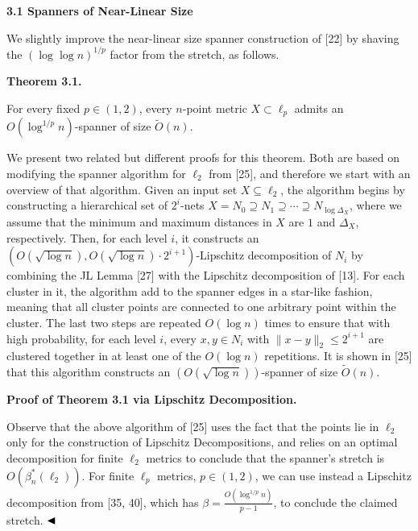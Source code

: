 \par
\par
\par\medskip\noindent\textbf{3.1 Spanners of Near-Linear Size}\par
We slightly improve the near-linear size spanner construction of [22] by shaving the $(\log\log{n})^{1/p}$ factor from the stretch, as follows.
\par
\par
\par\medskip\noindent\textbf{Theorem 3.1.}\par
For every fixed $p\in(1,2)$, every $n$-point metric $X\subset\ell_{p}$ admits an $O(\log^{1/p}{n})$-spanner of size $\tilde{O}(n)$.
\par
\par
\par
We present two related but different proofs for this theorem. Both are based on modifying the spanner algorithm for $\ell_{2}$ from [25], and therefore we start with an overview of that algorithm. Given an input set $X\subseteq\ell_{2}$, the algorithm begins by constructing a hierarchical set of $2^{i}$-nets $X=N_{0}\supseteq N_{1}\supseteq\cdots\supseteq N_{\log{\Delta_{X}}}$, where we assume that the minimum and maximum distances in $X$ are $1$ and $\Delta_{X}$, respectively. Then, for each level $i$, it constructs an $(O(\sqrt{\log n}),O(\sqrt{\log n})\cdot 2^{i+1})$-Lipschitz decomposition of $N_{i}$ by combining the JL Lemma [27] with the Lipschitz decomposition of [13]. For each cluster in it, the algorithm add to the spanner edges in a star-like fashion, meaning that all cluster points are connected to one arbitrary point within the cluster. The last two steps are repeated $O(\log n)$ times to ensure that with high probability, for each level $i$, every $x,y\in N_{i}$ with $\|x-y\|_{2}\leq 2^{i+1}$ are clustered together in at least one of the $O(\log n)$ repetitions. It is shown in [25] that this algorithm constructs an $(O(\sqrt{\log{n}}))$-spanner of size $\tilde{O}(n)$.
\par
\par
\par\medskip\noindent\textbf{Proof of Theorem 3.1 via Lipschitz Decomposition.}\par
Observe that the above algorithm of [25] uses the fact that the points lie in $\ell_{2}$ only for the construction of Lipschitz Decompositions, and relies on an optimal decomposition for finite $\ell_{2}$ metrics to conclude that the spanner’s stretch is $O(\beta^{*}_{n}(\ell_{2}))$. For finite $\ell_{p}$ metrics, $p\in(1,2)$, we can use instead a Lipschitz decomposition from [35, 40], which has $\beta=\frac{O(\log^{1/p}{n})}{p-1}$, to conclude the claimed stretch. $\hfill\blacktriangleleft$
